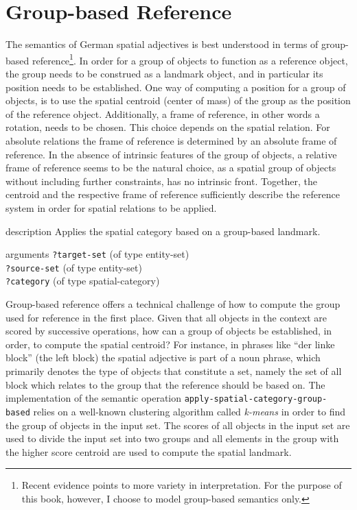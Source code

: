 \section{Group-based Reference}
The semantics of German spatial adjectives is best understood in terms of 
group-based reference\footnote{Recent evidence \citep{moratz2006spatial} 
points to more variety in interpretation. For the purpose of this book, however,
I choose to model group-based semantics only.}. In order for a group of objects 
to function as a reference object, the group needs to be construed as a landmark object, and in
particular its position needs to be established. One way of computing a position
for a group of objects, is to use the spatial centroid (center of mass) of the group 
as the position of the reference object. Additionally, a frame of reference, in other words
a rotation, needs to be chosen. This choice depends on the spatial relation. For
absolute relations the frame of reference is determined by an absolute 
frame of reference. In the absence of intrinsic features of the group of objects,
a relative frame of reference seems to be the natural choice, as a spatial group
of objects without including further constraints, has no intrinsic front. 
Together, the centroid and the respective frame of reference sufficiently 
describe the reference system in order for spatial 
relations to be applied.

\begin{explanation}{description}
Applies the spatial category based on a group-based landmark. 
\end{explanation}
\begin{explanation}{arguments}
{\footnotesize\verb+?target-set+} (of type entity-set) \\
{\footnotesize\verb+?source-set+} (of type entity-set) \\
{\footnotesize\verb+?category+} (of type spatial-category)
\vspace{0.3cm}
\end{explanation}

Group-based reference offers a technical challenge of how to 
compute the group used for reference in the first place. Given that
all objects in the context are scored by successive operations, how can
a group of objects be established, in order, to compute the
spatial centroid? For instance, in phrases like ``der linke block'' (the left block)
the spatial adjective is part of a noun phrase, which primarily denotes the type of
objects that constitute a set, namely the set of all block which relates to 
the group that the reference should be based on.
The implementation of the semantic operation 
{\footnotesize\tt apply-spatial-category-group-based} relies on a well-known clustering algorithm
called \emph{k-means} \citep{lloyd1982least} in order to find the group 
of objects in the input set. The scores of all objects in the input set 
are used to divide the input set into two groups and all elements 
in the group with the higher score centroid are used to compute 
the spatial landmark. 

